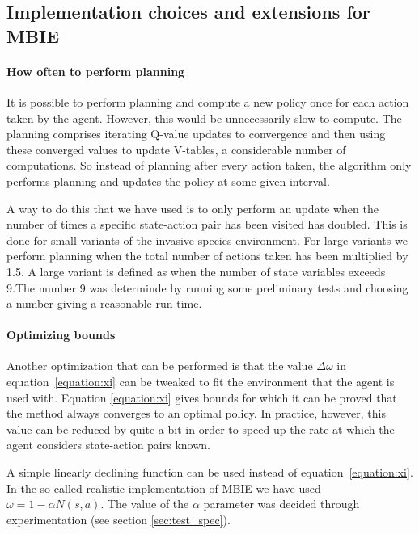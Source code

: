 \subsection{Implementation choices and extensions for MBIE}
\label{sec:MBIE_our_contribution}

\paragraph{How often to perform planning}
\label{sec:mbie_perform_planning}

It is possible to perform planning and compute a new policy once for each
action taken by the agent. However, this would be unnecessarily slow to
compute. The planning comprises iterating Q-value updates to convergence and
then using these converged values to update V-tables, a considerable number of
computations. So instead of planning after every action taken, the algorithm
only performs planning and updates the policy at some given interval. 

A way to do this that we have used is to only perform an update when the
number of times a specific state-action pair has been visited has doubled. This is done for small variants of the invasive species environment. For
large variants we perform planning when
the total number of actions taken has been multiplied by 1.5. A large variant is defined as when the number of state variables exceeds 9.The number 9 was determinde by running some preliminary tests and choosing a number giving a reasonable run time.

\paragraph{Optimizing bounds} Another optimization that can be performed is that the value $\Delta \omega$ in
equation~\eqref{equation:xi} can be tweaked to fit the environment that the agent
is used with. Equation \eqref{equation:xi} gives bounds for which it can be
proved that the method always converges to an optimal policy. In practice,
however, this value can be reduced by quite a bit in order to speed up the rate
at which the agent considers state-action pairs known. 

A simple linearly declining function can be used instead of
equation~\eqref{equation:xi}. In the so called realistic implementation of MBIE we have
used $\omega = 1 - \alpha N(s,a).$ The value of the $\alpha$ parameter was decided through experimentation (see section \ref{sec:test_spec}).


